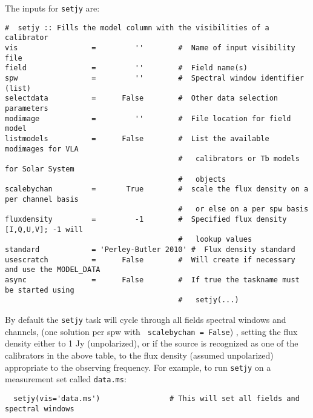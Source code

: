 %


The inputs for {\tt setjy} are:
\small
\begin{verbatim}
#  setjy :: Fills the model column with the visibilities of a calibrator
vis                 =         ''        #  Name of input visibility file
field               =         ''        #  Field name(s)
spw                 =         ''        #  Spectral window identifier (list)
selectdata          =      False        #  Other data selection parameters
modimage            =         ''        #  File location for field model
listmodels          =      False        #  List the available modimages for VLA
                                        #   calibrators or Tb models for Solar System
                                        #   objects
scalebychan         =       True        #  scale the flux density on a per channel basis
                                        #   or else on a per spw basis
fluxdensity         =         -1        #  Specified flux density [I,Q,U,V]; -1 will
                                        #   lookup values
standard            = 'Perley-Butler 2010' #  Flux density standard
usescratch          =      False        #  Will create if necessary and use the MODEL_DATA
async               =      False        #  If true the taskname must be started using
                                        #   setjy(...)
\end{verbatim}
\normalsize By default the {\tt setjy} task will cycle through all
fields spectral windows and channels, (one solution per spw with {\tt
  scalebychan = False}) , setting the flux density either to 1 Jy
(unpolarized), or if the source is recognized as one of the
calibrators in the above table, to the flux density (assumed
unpolarized) appropriate to the observing frequency.  For example, to
run {\tt setjy} on a measurement set called {\tt data.ms}: \small
\begin{verbatim}
  setjy(vis='data.ms')                # This will set all fields and spectral windows
\end{verbatim}
\normalsize


